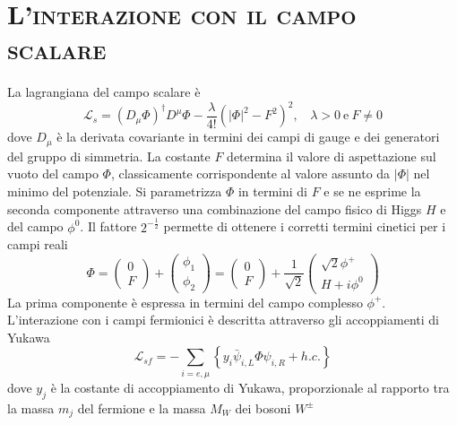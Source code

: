 \documentclass[11pt]{article}
\begin{document}
    \section{\centering\textsc{L'interazione con il campo scalare} } 
    La lagrangiana del campo scalare è
    \begin{equation}
    \mathcal{L}_s=\left(D_\mu\Phi\right)^\dagger D^\mu\Phi-\frac{\lambda}{4!}\left(\lvert\Phi\rvert^2-F^2\right)^2, \ \ \ \ \lambda>0\ \mathrm{e} \ F\neq0
    \end{equation}
    dove $D_\mu$ è la derivata covariante in termini dei campi di gauge e dei generatori del gruppo di simmetria. La costante $F$ determina il valore di aspettazione sul vuoto del campo $\Phi$, classicamente corrispondente
    al valore assunto da $\lvert\Phi\rvert$ nel minimo del potenziale. Si parametrizza $\Phi$ in termini di $F$ e se ne esprime la seconda componente attraverso una combinazione del campo fisico di Higgs $H$ e del campo $\phi^0$.
    Il fattore $2^{-\frac{1}{2}}$ permette di ottenere i corretti termini cinetici per i campi reali
    \begin{equation}\label{PhiParameterization}
    \Phi=\begin{pmatrix}0 \\F\end{pmatrix}+\begin{pmatrix}\phi_1 \\\phi_2\end{pmatrix}=\begin{pmatrix}0\\F\end{pmatrix}+\frac{1}{\sqrt{2}}\begin{pmatrix}\sqrt{2}\phi^+ \\H+i\phi^0\end{pmatrix}
    \end{equation}
    La prima componente è espressa in termini del campo complesso $\phi^+$. L'interazione con i campi fermionici è descritta attraverso gli accoppiamenti di Yukawa
    \begin{equation}\label{YukawaCouplings}
    \mathcal{L}_{sf}=-\sum_{i=e,\mu}\left\{y_i\bar{\psi}_{i,L}\Phi\psi_{i,R}+h.c.\right\}
    \end{equation}
    dove $y_j$ è la costante di accoppiamento di Yukawa, proporzionale al rapporto tra la massa $m_j$ del fermione e la massa $M_W$ dei bosoni $W^\pm$
\end{document}

